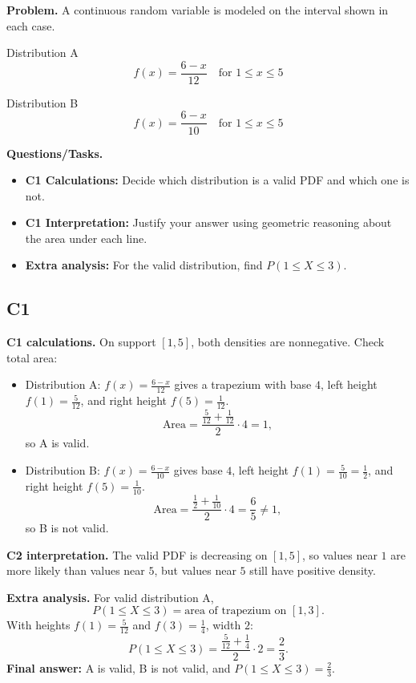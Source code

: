 	\textbf{Problem.}
	A continuous random variable is modeled on the interval shown in each case.
	
	Distribution A
	\[
	f(x)=\frac{6-x}{12}\quad\text{for }1\le x\le 5
	\]
	
	Distribution B
	\[
	f(x)=\frac{6-x}{10}\quad\text{for }1\le x\le 5
	\]
	
	\textbf{Questions/Tasks.}
	\begin{itemize}
		\item \textbf{C1 Calculations:} Decide which distribution is a valid PDF and which one is not.
		\item \textbf{C1 Interpretation:} Justify your answer using geometric reasoning about the area under each line.
		\item \textbf{Extra analysis:} For the valid distribution, find $P(1\le X\le 3)$.
	\end{itemize}
	
	\subsection*{C1}
	
	\textbf{C1 calculations.}
	On support $[1,5]$, both densities are nonnegative. Check total area:
	\begin{itemize}
		\item Distribution A: $f(x)=\frac{6-x}{12}$ gives a trapezium with base $4$, left height $f(1)=\frac{5}{12}$, and right height $f(5)=\frac{1}{12}$.
		\[
		\text{Area}=\frac{\frac{5}{12}+\frac{1}{12}}{2}\cdot 4=1,
		\]
		so A is valid.
		\item Distribution B: $f(x)=\frac{6-x}{10}$ gives base $4$, left height $f(1)=\frac{5}{10}=\frac12$, and right height $f(5)=\frac{1}{10}$.
		\[
		\text{Area}=\frac{\frac12+\frac{1}{10}}{2}\cdot 4=\frac65\ne1,
		\]
		so B is not valid.
	\end{itemize}
	
	\textbf{C2 interpretation.}
	The valid PDF is decreasing on $[1,5]$, so values near $1$ are more likely than values near $5$, but values near $5$ still have positive density.
	
	\textbf{Extra analysis.}
	For valid distribution A,
	\[
	P(1\le X\le3)=\text{area of trapezium on }[1,3].
	\]
	With heights $f(1)=\frac{5}{12}$ and $f(3)=\frac14$, width $2$:
	\[
	P(1\le X\le3)=\frac{\frac{5}{12}+\frac14}{2}\cdot 2=\frac23.
	\]
	\textbf{Final answer:} A is valid, B is not valid, and $P(1\le X\le3)=\frac23$.

